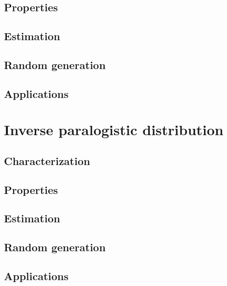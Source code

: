 \subsection{Properties}
\subsection{Estimation}
\subsection{Random generation}
\subsection{Applications}

\section{Inverse paralogistic distribution}
\subsection{Characterization}
\subsection{Properties}
\subsection{Estimation}
\subsection{Random generation}
\subsection{Applications}

